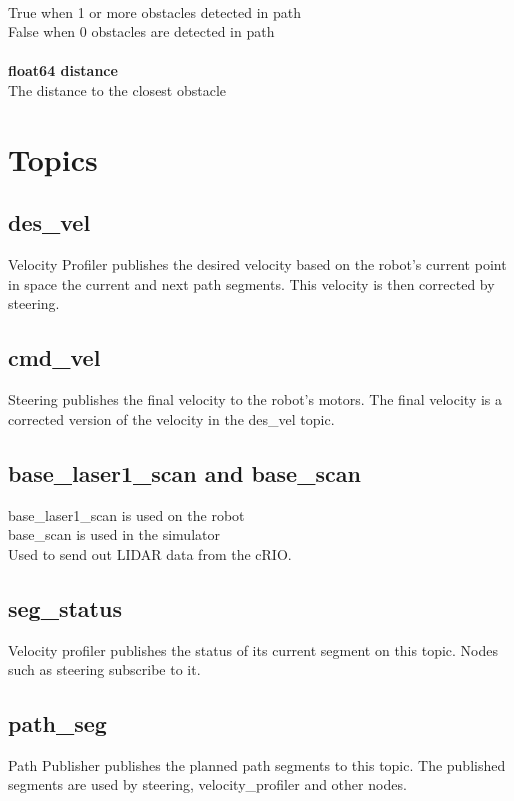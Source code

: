 \\
\indent True when 1 or more obstacles detected in path\\
\indent False when 0 obstacles are detected in path\\
\\
{\bf float64 distance}\\
\indent The distance to the closest obstacle

\section{Topics}

\subsection{des\_vel}
Velocity Profiler publishes the desired velocity based on the robot's
current point in space the current and next path segments.  This
velocity is then corrected by steering.

\subsection{cmd\_vel}
Steering publishes the final velocity to the robot's motors.  The
final velocity is a corrected version of the velocity in the des\_vel topic.

\subsection{base\_laser1\_scan and base\_scan}
base\_laser1\_scan is used on the robot\\
base\_scan is used in the simulator\\

\noindent Used to send out LIDAR data from the cRIO.

\subsection{seg\_status}
Velocity profiler publishes the status of its current segment on this
topic.  Nodes such as steering subscribe to it.

\subsection{path\_seg}
Path Publisher publishes the planned path segments to this topic.  The
published segments are used by steering, velocity\_profiler and other nodes.